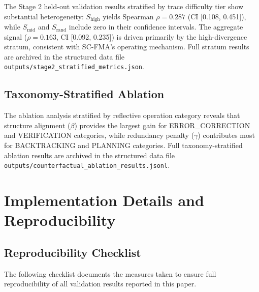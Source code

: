 \documentclass[pdflatex,sn-mathphys-num]{sn-jnl}
\begin{document}
The Stage 2 held-out validation results stratified by trace difficulty tier show substantial heterogeneity: $S_{\text{high}}$ yields Spearman $\rho = 0.287$ (CI [0.108, 0.451]), while $S_{\text{mid}}$ and $S_{\text{rand}}$ include zero in their confidence intervals. The aggregate signal ($\rho = 0.163$, CI [0.092, 0.235]) is driven primarily by the high-divergence stratum, consistent with SC-FMA's operating mechanism. Full stratum results are archived in the structured data file \texttt{outputs/stage2\_stratified\_metrics.json}.

\subsection{Taxonomy-Stratified Ablation}
\label{app:taxonomy-ablation}

The ablation analysis stratified by reflective operation category reveals that structure alignment ($\beta$) provides the largest gain for ERROR\_CORRECTION and VERIFICATION categories, while redundancy penalty ($\gamma$) contributes most for BACKTRACKING and PLANNING categories. Full taxonomy-stratified ablation results are archived in the structured data file \texttt{outputs/counterfactual\_ablation\_results.jsonl}.

\section{Implementation Details and Reproducibility}
\label{app:implementation}

\subsection{Reproducibility Checklist}
\label{app:repro-checklist}

The following checklist documents the measures taken to ensure full reproducibility of all validation results reported in this paper.
\end{document}
